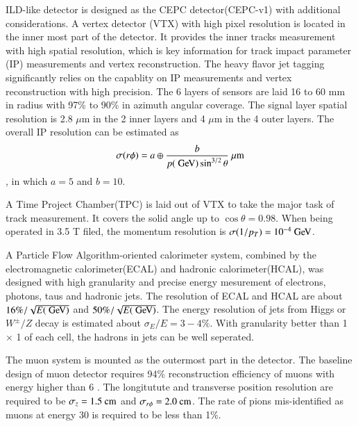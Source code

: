  ILD-like detector is designed as the CEPC detector(CEPC-v1) with additional considerations\cite{CEPC_preCDR}.  
A vertex detector (VTX) with high pixel resolution is located in the inner 
most part of the detector. It provides the inner tracks measurement with high spatial resolution, which is key information for track impact parameter 
 (IP) measurements and vertex reconstruction. The heavy flavor jet tagging significantly relies on the capablity on IP measurements and vertex reconstruction with high precision. 
The 6 layers of sensors are laid 16 to 60 mm in radius with 97\% to 90\% in azimuth angular coverage. The signal layer spatial resolution is 2.8 $\mu$m in the 2 inner 
layers and 4 $\mu$m in the 4 outer layers. The overall IP resolution can be estimated as 
\begin{equation}
{\sigma(r\phi)}= a \oplus \frac{b}{p(\mathrm{\GeV}) \sin^{3/2} \theta }\mum
\end{equation},
in which $a = 5$ and $b = 10$.\par %
A Time Project Chamber(TPC) is laid out of VTX to take the major task of track 
measurement. It covers the solid angle up to $\cos \theta = 0.98$. 
When being operated in 3.5 T filed, the momentum resolution is 
$\sigma(1/p_T) = 10^{-4}\GeV$. \par
A Particle Flow Algorithm-oriented\cite{PFA} calorimeter system, combined by the electromagnetic calorimeter(ECAL) 
and hadronic calorimeter(HCAL), was designed with high granularity and precise energy mesurement of electrons, photons, taus and hadronic jets. 
The resolution of ECAL and HCAL are about $16\%/\sqrt{E(\GeV)}$ and $50\%/\sqrt{E(\GeV)}$. The energy resolution of jets from Higgs or $W^{\pm}/Z$ 
decay is estimated about $\sigma_E/E = 3-4 \%$. With granularity better than 1 \cm $\times$ 1 \cm of each cell, the hadrons in jets can be well seperated. \par
The muon system is mounted as the outermost part in the detector. The baseline 
design of muon detector requires 94\% reconstruction efficiency of muons with 
energy higher than 6 \GeV. The longitutute and transverse position resolution 
are required to be $\sigma _{z} = 1.5 \cm$ and $\sigma_{r\phi} = 2.0 \cm$. The 
rate of pions mis-identified as muons at energy 30 \GeV is required to be less 
than 1\%.\par

